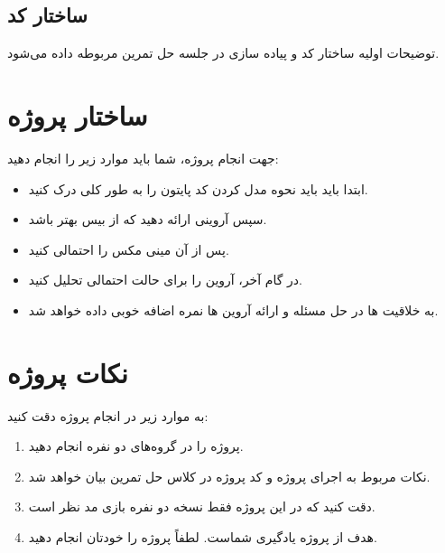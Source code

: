 \documentclass{article}
\begin{document}
\begin{large}
    \subsection{ساختار کد}
    توضیحات اولیه ساختار کد و پیاده سازی در جلسه حل تمرین مربوطه داده می‌شود.
    
    \section{ساختار پروژه}
    جهت انجام پروژه، شما باید موارد زیر را انجام دهید:
    \begin{itemize}
        \item ابتدا باید باید نحوه مدل کردن کد پایتون را به طور کلی درک کنید.
        \item سپس  آروینی ارائه دهید که از بیس بهتر باشد.
        \item پس از آن مینی مکس را احتمالی کنید.
        \item در گام آخر، آروین را برای حالت احتمالی تحلیل کنید.
        \item به خلاقیت ها در حل مسئله و ارائه آروین ها نمره اضافه خوبی داده خواهد شد.
        
    \end{itemize}

    \section{نکات پروژه }
    به موارد زیر در انجام پروژه دقت کنید:
    \begin{enumerate}
    \item پروژه را در گروه‌های دو نفره انجام دهید.
    \item نکات مربوط به اجرای پروژه و کد پروژه در کلاس حل تمرین بیان خواهد شد.
    \item دقت کنید که در این پروژه فقط نسخه دو نفره بازی مد نظر است.
    \item هدف از پروژه یادگیری شماست. لطفاً پروژه را خودتان انجام دهید.
    
    \end{enumerate}

    
\end{large}

	 
\end{document}
